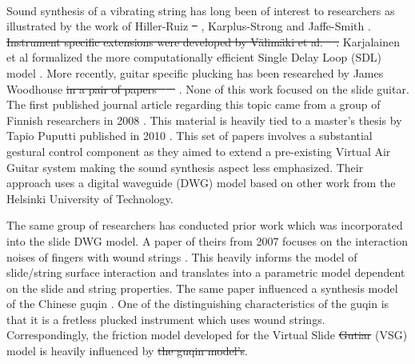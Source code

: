 \documentclass[12pt]{article}
\providecommand{\DIFadd}[1]{{\protect\color{blue}\uwave{#1}}} %
\providecommand{\DIFdel}[1]{{\protect\color{red}\sout{#1}}}                      %
\providecommand{\DIFaddbegin}{} %
\providecommand{\DIFaddend}{} %
\providecommand{\DIFdelbegin}{} %
\providecommand{\DIFdelend}{} %
\begin{document}
\paragraph{}
Sound synthesis of a vibrating string has long been of interest to researchers as illustrated by the work of Hiller-Ruiz \cite{hiller_synthesizing_1971}\DIFdelbegin \DIFdel{\mbox{%
\cite{hiller_synthesizing_1971-1}}\hskip0pt%
}\DIFdelend , Karplus-Strong \cite{karplus_digital_1983} and Jaffe-Smith \cite{jaffe_extensions_1983}. \DIFdelbegin \DIFdel{Instrument specific extensions were developed by Välimäki et al. \mbox{%
\cite{vaelimaeki_physical_1996}}\hskip0pt%
.  }\DIFdelend Karjalainen et al formalized the more computationally efficient Single Delay Loop (SDL) model \cite{karjalainen_plucked-string_1998}. More recently, guitar specific plucking has been researched by James Woodhouse \DIFdelbegin \DIFdel{in a pair of papers \mbox{%
\cite{woodhouse_synthesis_2004}}\hskip0pt%
\mbox{%
\cite{woodhouse_plucked_2004}}\hskip0pt%
}\DIFdelend \DIFaddbegin \DIFadd{\mbox{%
\cite{woodhouse_synthesis_2004}}\hskip0pt%
}\DIFaddend . None of this work focused on the slide guitar. The first published journal article regarding this topic came from a group of Finnish researchers in 2008 \cite{pakarinen_virtual_2008}. This material is heavily tied to a master’s thesis by Tapio Puputti published in 2010 \cite{puputti_real-time_2012}. This set of papers involves a substantial gestural control component as they aimed to extend a pre-existing Virtual Air Guitar system making the sound synthesis aspect less emphasized. Their approach uses a digital waveguide (DWG) model based on other work from the Helsinki University of Technology.

The same group of researchers has conducted prior work which was incorporated into the slide DWG model. A paper of theirs from 2007 focuses on the interaction noises of fingers with wound strings \cite{pakarinen_analysis_2007}. This heavily informs the model of slide/string surface interaction and translates into a parametric model dependent on the slide and string properties. The same paper influenced a synthesis model of the Chinese guqin \cite{penttinen_model-based_2006}. One of the distinguishing characteristics of the guqin is that it is a fretless plucked instrument which uses wound strings. Correspondingly, the friction model developed for the Virtual Slide \DIFdelbegin \DIFdel{Gutiar }\DIFdelend \DIFaddbegin \DIFadd{Guitar }\DIFaddend (VSG) model is heavily influenced by \DIFdelbegin \DIFdel{the guqin model's}\DIFdelend \DIFaddbegin \DIFadd{that of the guqin}\DIFaddend .
\end{document}
